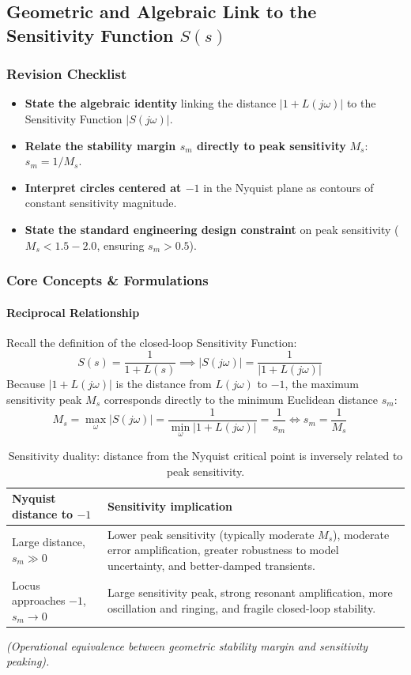 \documentclass[12pt,onecolumn,twoside ]{article}
\begin{document}
	\subsection{Geometric and Algebraic Link to the Sensitivity Function $S(s)$}
	\subsubsection{Revision Checklist}
	\begin{itemize}
		\item[$\square$]
		\textbf{State the algebraic identity} linking the distance $|1 + L(j\omega)|$ to the Sensitivity Function $|S(j\omega)|$.
		\item[$\square$]
		\textbf{Relate the stability margin $s_m$ directly to peak sensitivity} $M_s$: $s_m = 1/M_s$.
		\item[$\square$]
		\textbf{Interpret circles centered at $-1$} in the Nyquist plane as contours of constant sensitivity magnitude.
		\item[$\square$]
		\textbf{State the standard engineering design constraint} on peak sensitivity ($M_s < 1.5 - 2.0$, ensuring $s_m > 0.5$).
	\end{itemize}
	
	\subsubsection{Core Concepts \& Formulations}
	\paragraph{Reciprocal Relationship}
	Recall the definition of the closed-loop Sensitivity Function: \[
	S(s) = \frac{1}{1 + L(s)} \implies |S(j\omega)| = \frac{1}{|1 + L(j\omega)|} \quad
	\] Because $|1 + L(j\omega)|$ is the distance from $L(j\omega)$ to $-1$, the maximum sensitivity peak $M_s$ corresponds directly to the minimum Euclidean distance $s_m$: \[
	M_s = \max_{\omega} |S(j\omega)| = \frac{1}{\min_\omega |1 + L(j\omega)|} = \frac{1}{s_m} \iff s_m = \frac{1}{M_s} \quad
	\]
	\begin{table}[H]
		\centering
		\small
		\begin{tabularx}{\textwidth}{>{\raggedright\arraybackslash}X>{\raggedright\arraybackslash}X}
			\toprule
			\textbf{Nyquist distance to $-1$} & \textbf{Sensitivity implication}\\
			\midrule
			Large distance, $s_m\gg0$ & Lower peak sensitivity (typically moderate $M_s$), moderate error amplification, greater robustness to model uncertainty, and better-damped transients.\\
			Locus approaches $-1$, $s_m\rightarrow0$ & Large sensitivity peak, strong resonant amplification, more oscillation and ringing, and fragile closed-loop stability.\\
			\bottomrule
		\end{tabularx}
		\caption{Sensitivity duality: distance from the Nyquist critical point is inversely related to peak sensitivity.}
		\label{tab:sensitivity-duality}
	\end{table}
	\textit{(Operational equivalence between geometric stability margin and sensitivity peaking).}
\end{document}
